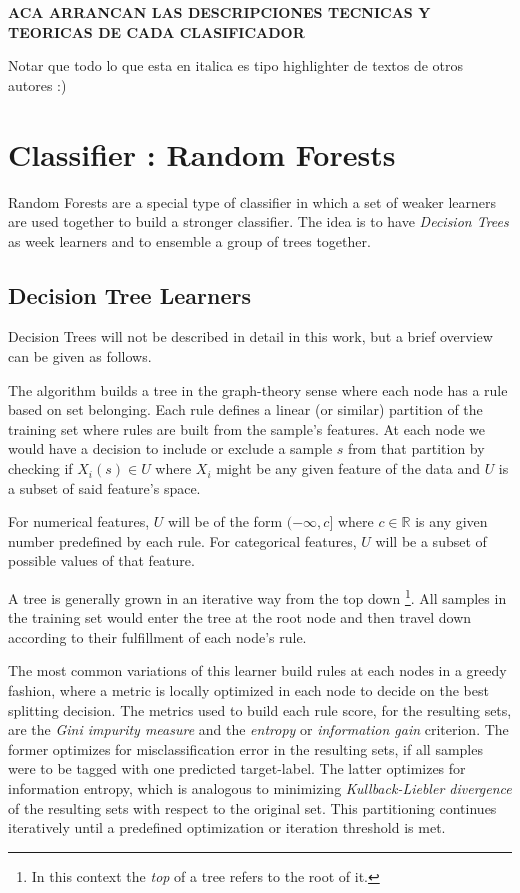 \textbf{ACA ARRANCAN LAS DESCRIPCIONES TECNICAS Y TEORICAS DE CADA CLASIFICADOR}

Notar que todo lo que esta en italica es tipo highlighter de textos de otros autores :)

\section{Classifier : Random Forests}

Random Forests are a special type of classifier in which a set of weaker learners are used together to build a stronger classifier. The idea is to have \textit{Decision Trees} as week learners and to ensemble a group of trees together.

\subsection{Decision Tree Learners}

Decision Trees will not be described in detail in this work, but a brief overview can be given as follows. 

The algorithm builds a tree in the graph-theory sense where each node has a rule based on set belonging. Each rule defines a linear (or similar) partition of the training set where rules are built from the sample's features. At each node we would have a decision to include or exclude a sample $s$ from that partition by checking if $X_i(s) \in U$ where $X_i$ might be any given feature of the data and $U$ is a subset of said feature's space.

For numerical features, $U$ will be of the form $(-\infty,c]$ where $c \in \mathbb{R}$ is any given number predefined by each rule. For categorical features, $U$ will be a subset of possible values of that feature.

A tree is generally grown in an iterative way from the top down \footnote{In this context the \textit{top} of a tree refers to the root of it.}. All samples in the training set would enter the tree at the root node and then travel down according to their fulfillment of each node's rule. 

The most common variations of this learner build rules at each nodes in a greedy fashion, where a metric is locally optimized in each node to decide on the best splitting decision. The metrics used to build each rule score, for the resulting sets, are the \textit{Gini impurity measure} and the \textit{entropy} or \textit{information gain} criterion. The former optimizes for misclassification error in the resulting sets, if all samples were to be tagged with one predicted target-label. The latter optimizes for information entropy, which is analogous to minimizing \textit{Kullback-Liebler divergence} of the resulting sets with respect to the original set. This partitioning continues iteratively until a predefined optimization or iteration threshold is met. 

